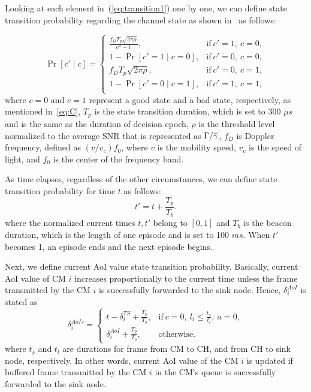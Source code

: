 \documentclass[journal]{IEEEtran}
\begin{document}
Looking at each element in~(\ref{eq:transition1}) one by one, we can define state transition probability regarding the channel state as shown in~\cite{Boujemaa2005} as follows:

\begin{equation}
\Pr \left[ {c' \mid c } \right] = \left\{ {
    \begin{array}{*{20}{l}}
        {\displaystyle \frac{f_D T_p \sqrt{2\pi\rho}}{e^\rho-1},} & {\textrm{if} \  c'=1, \ c=0 }, \\
        {\displaystyle 1-{\Pr \left[ {c'=1\mid c=0} \right]},} & {\textrm{if} \  c'=0, \ c=0}, \\
        {\displaystyle f_D T_p \sqrt{2\pi\rho},} & {\textrm{if} \  c'=0,\ c=1 }, \\
        {\displaystyle 1-{\Pr \left[ {c'=0\mid c=1} \right]},} & {\textrm{if} \  c'=1,\ c=1 }, \\ 
    \end{array}} \right.
\label{eq:tran_c}
\end{equation}
where $c=0$ and $c=1$ represent a good state and a bad state, respectively, as mentioned in~\eqref{eq:C}, $T_p$ is the state transition duration, which is set to 300 $\mu s$ and is the same as the duration of decision epoch, $\rho$ is the threshold level normalized to the average SNR that is represented as $\Gamma/\Bar{\gamma}$, $f_D$ is Doppler frequency, defined as $(v / v_c) f_0$, where $v$ is the mobility speed, $v_c$ is the speed of light, and $f_0$ is the center of the frequency band.

As time elapses, regardless of the other circumstances, we can define state transition probability for time $t$ as follows:
\begin{equation}
    t' = t + \frac{T_p}{T_{b}}.
\label{eq:tran_t}
\end{equation}
where the normalized current times $t, t'$ belong to $[0, 1]$ and $T_{b}$ is the beacon duration, which is the length of one episode and is set to 100 $ms$. When $t'$ becomes 1, an episode ends and the next episode begins.

Next, we define current AoI value state transition probability. Basically, current AoI value of CM $i$ increases proportionally to the current time unless the frame transmitted by the CM $i$ is successfully forwarded to the sink node. Hence, $\delta^{AoI}_{i}$ is stated as
\begin{equation}
    \delta^{AoI}_{i}{}' = \left\{ {
    \begin{array}{*{20}{l}}
        {\displaystyle t-\delta^{TS}_{i}+\frac{T_p}{T_{b}},} & {\displaystyle \textrm{if} \ c=0, \ l_i \leq \frac{t_s}{t_l}, \ a=0}, \\ 
        {\displaystyle \delta^{AoI}_{i} + \frac{T_p}{T_{b}} ,} & {\textrm{otherwise}}.
    \end{array}} \right.
\label{eq:tran_curr}
\end{equation}
where $t_s$ and $t_l$ are durations for frame from CM to CH, and from CH to sink node, respectively. In other words, current AoI value of the CM $i$ is updated if buffered frame transmitted by the CM $i$ in the CM's queue is successfully forwarded to the sink node.
\end{document}
